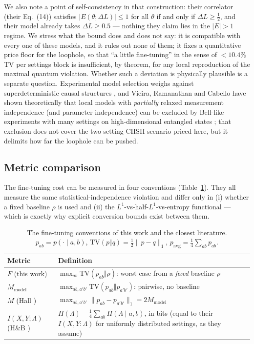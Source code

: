 \documentclass[aps,pra,reprint,superscriptaddress,floatfix]{revtex4-2}
\newcommand{\TV}{\mathrm{TV}}
\begin{document}
We also note a point of self-consistency in that construction: their
correlator (their Eq.~(14)) satisfies $|E(\theta;\Delta L)|\le1$ for all
$\theta$ if and only if $\Delta L\ge\tfrac12$, and their model already
takes $\Delta L\ge0.5$ --- nothing they claim lies in the $|E|>1$ regime.
We stress what the bound does and does not say: it is compatible with every
one of these models, and it rules out none of them; it fixes a
quantitative price floor for the loophole, so that ``a little
fine-tuning'' in the sense of $<10.4\%$ TV per settings block is
insufficient, by theorem, for any local reproduction of the maximal
quantum violation. Whether such a deviation is physically plausible is a
separate question. Experimental model selection weighs against
superdeterministic causal structures \cite{daley2022}, and Vieira,
Ramanathan and Cabello have shown theoretically that local models with
\emph{partially} relaxed measurement independence (and parameter
independence) can be excluded by Bell-like experiments with many settings on
high-dimensional entangled states \cite{vieira2025}; that exclusion does not
cover the two-setting CHSH scenario priced here, but it delimits how far the
loophole can be pushed.

\subsection{Metric comparison}
\label{sec:metric}

The fine-tuning cost can be measured in four conventions
(Table~\ref{tab:metrics}). They all measure the same
statistical-independence violation and differ only in (i) whether a fixed
baseline $\rho$ is used and (ii) the $L^1$-vs-half-$L^1$-vs-entropy
functional --- which is exactly why explicit conversion bounds exist
between them.

\begin{table}[htbp]
\caption{The fine-tuning conventions of this work and the closest
literature. $p_{ab}=p(\cdot\mid a,b)$,
$\TV(p\Vert q)=\tfrac12\|p-q\|_1$, $p_{\mathrm{avg}}=\tfrac14\sum_{ab}p_{ab}$.}
\label{tab:metrics}
\small
\begin{tabular}{@{}>{\raggedright\arraybackslash}p{3.1cm}>{\raggedright\arraybackslash}p{5.3cm}@{}}
\toprule
Metric & Definition \\ \midrule
$F$ (this work)
& $\max_{ab}\TV(p_{ab}\Vert\rho)$: worst case from a \emph{fixed} baseline $\rho$ \\ \addlinespace
$M_{\mathrm{model}}$
& $\max_{ab,a'b'}\TV(p_{ab}\Vert p_{a'b'})$: pairwise, no baseline \\ \addlinespace
$M$ (Hall \cite{hall2010})
& $\max_{ab,a'b'}\|p_{ab}-p_{a'b'}\|_1 = 2M_{\mathrm{model}}$ \\ \addlinespace
$I(X,Y;\Lambda)$ (H\&B \cite{hallbranciard2020})
& $H(\Lambda)-\tfrac14\sum_{ab}H(\Lambda\mid a,b)$, in bits (equal to their $I(X,Y{:}\Lambda)$ for uniformly distributed settings, as they assume) \\ \bottomrule
\end{tabular}
\end{table}
\end{document}
